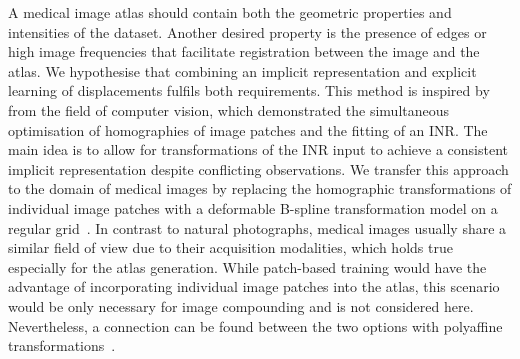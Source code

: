 

A medical image atlas should contain both the geometric properties and intensities of the dataset. Another desired property is the presence of edges or high image frequencies that facilitate registration between the image and the atlas. We hypothesise that combining an implicit representation and explicit learning of displacements fulfils both requirements. This method is inspired by~\cite{lin2021barf} from the field of computer vision, which demonstrated the simultaneous optimisation of homographies of image patches and the fitting of an INR. The main idea is to allow for transformations of the INR input to achieve a consistent implicit representation despite conflicting observations. We transfer this approach to the domain of medical images by replacing the homographic transformations of individual image patches with a deformable B-spline transformation model on a regular grid~\cite{modat2010fast}. In contrast to natural photographs, medical images usually share a similar field of view due to their acquisition modalities, which holds true especially for the atlas generation. While patch-based training would have the advantage of incorporating individual image patches into the atlas, this scenario would be only necessary for image compounding and is not considered here. Nevertheless, a connection can be found between the two options with polyaffine transformations~\cite{taquetpolyaffine}.

